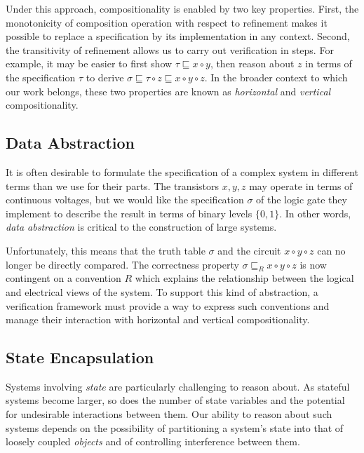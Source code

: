 \documentclass[acmsmall,screen,review,anonymous]{acmart}
\begin{document}
Under this approach,
compositionality is enabled by two key properties.
First,
the monotonicity of composition operation
with respect to refinement
makes it possible to replace a specification by its implementation
in any context.
Second,
the transitivity of refinement
allows us to carry out verification in steps.
For example,
it may be easier to first show
$\tau \sqsubseteq x \circ y$,
then reason about $z$ in terms of the specification $\tau$
to derive
$\sigma \sqsubseteq \tau \circ z \sqsubseteq x \circ y \circ z$.
In the broader context to which our work belongs,
these two properties are known as
\emph{horizontal} and \emph{vertical} compositionality.


\subsection{Data Abstraction} %

It is often desirable to formulate the specification of a complex system
in different terms than we use for their parts.
The transistors $x, y, z$ may operate in terms of continuous voltages,
but we would like the specification $\sigma$
of the logic gate they implement
to describe the result in terms of binary levels $\{0, 1\}$.
In other words,
\emph{data abstraction} is critical to the construction of large systems.

Unfortunately,
this means that the truth table $\sigma$
and the circuit $x \circ y \circ z$
can no longer be directly compared.
The correctness property $\sigma \sqsubseteq_R x \circ y \circ z$
is now contingent on a convention $R$
which explains the relationship between
the logical and electrical views of the system.
To support this kind of abstraction,
a verification framework must provide a way to express
such conventions
and manage their interaction with horizontal and vertical compositionality.


\subsection{State Encapsulation} %

Systems involving \emph{state} are particularly challenging to reason about.
As stateful systems become larger,
so does the number of state variables
and the potential for undesirable interactions between them.
Our ability to reason about such systems
depends on the possibility of partitioning a system's state
into that of loosely coupled \emph{objects}
and of controlling interference between them.
\end{document}
